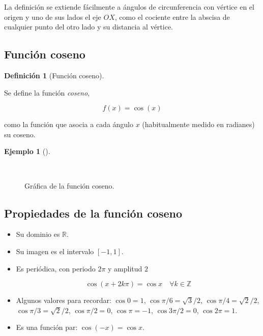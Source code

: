 \documentclass[
  a4paper,
]{scrreport}
\theoremstyle{plain}
\theoremstyle{plain}
\theoremstyle{definition}
\newtheorem{definition}{Definición}[chapter]
\theoremstyle{plain}
\theoremstyle{definition}
\newtheorem{example}{Ejemplo}[chapter]
\theoremstyle{remark}
\begin{document}
La definición se extiende fácilmente a ángulos de circunferencia con
vértice en el origen y uno de sus lados el eje \(OX\), como el cociente
entre la abscisa de cualquier punto del otro lado y su distancia al
vértice.

\hypertarget{funciuxf3n-coseno}{%
\subsection{Función coseno}\label{funciuxf3n-coseno}}

\leavevmode{}%
\begin{definition}[Función coseno]\label{def-funcion-coseno}

Se define la función \emph{coseno},

\[f(x)=\cos(x)\]

como la función que asocia a cada ángulo \(x\) (habitualmente medido en
radianes) su coseno.

\end{definition}

\leavevmode{}%
\begin{example}[]\label{exm-grafica-funcion-coseno}

~

\begin{figure}

{\centering 



}

\caption{Gráfica de la función coseno.}

\end{figure}

\end{example}

\hypertarget{propiedades-de-la-funciuxf3n-coseno}{%
\subsection{Propiedades de la función
coseno}\label{propiedades-de-la-funciuxf3n-coseno}}

\begin{itemize}
\item
  Su dominio es \(\mathbb{R}\).
\item
  Su imagen es el intervalo \([-1,1]\).
\item
  Es periódica, con periodo \(2\pi\) y amplitud \(2\)

  \[\cos (x+2k\pi)= \cos x\quad \forall k\in \mathbb{Z}\]
\item
  Algunos valores para recordar: \(\cos 0=1\),
  \(\cos \pi/6= \sqrt{3}/2\), \(\cos \pi/4=\sqrt{2}/2\),
  \(\cos \pi/3= \sqrt{2}/2\), \(\cos \pi/2 =0\), \(\cos \pi = -1\),
  \(\cos 3\pi/2=0\), \(\cos 2\pi=1\).
\item
  Es una función par: \(\cos(-x)=\cos x\).
\end{itemize}
\end{document}
